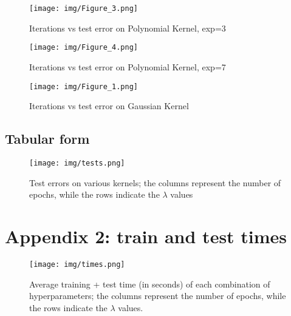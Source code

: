 \documentclass[a4paper]{article}
\begin{document}
\begin{figure}[htbp]
\centering
\texttt{[image: img/Figure\_3.png]}
\caption[Short caption]{Iterations vs test error on Polynomial Kernel, exp=3}
\end{figure}

\begin{figure}[htbp]
\centering
\texttt{[image: img/Figure\_4.png]}
\caption[Short caption]{Iterations vs test error on Polynomial Kernel, exp=7}
\end{figure}

\begin{figure}[htbp]
\centering
\texttt{[image: img/Figure\_1.png]}
\caption[Short caption]{Iterations vs test error on Gaussian Kernel}
\end{figure}

\clearpage

\subsection{Tabular form}
\label{sec:org0495df7}

\begin{figure}[htbp]
\centering
\texttt{[image: img/tests.png]}
\caption[Short caption]{Test errors on various kernels; the columns represent the number of epochs, while the rows indicate the \(\lambda\) values}
\end{figure}

\section{Appendix 2: train and test times}
\label{sec:org87af337}
\label{org5ad8668}

\begin{figure}[htbp]
\centering
\texttt{[image: img/times.png]}
\caption[Short caption]{Average training + test time (in seconds) of each combination of hyperparameters; the columns represent the number of epochs, while the rows indicate the \(\lambda\) values.}
\end{figure}

\vfill
\clearpage
\end{document}
